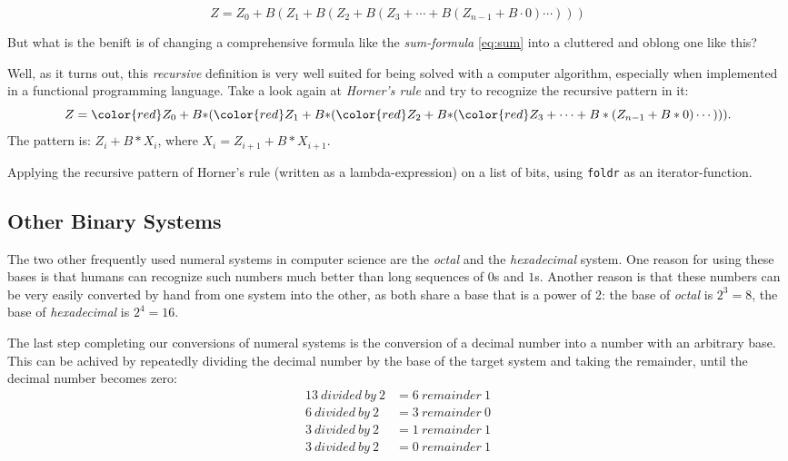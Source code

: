 \begin{equation} \label{eq:horner}
\boxed{Z=Z_0+B(Z_1+B(Z_2+B(Z_3+\cdots+B(Z_{n-1}+B\cdot0)\cdots)))}
\end{equation}

But what is the benift is of changing a comprehensive formula like the \emph{sum-formula} \eqref{eq:sum} into a cluttered and oblong one like this?

Well, as it turns out, this \emph{recursive} definition is very well suited for being solved with a computer algorithm, especially when implemented in a functional programming language.
Take a look again at \emph{Horner's rule} and try to recognize the recursive pattern in it:
\begin{equation*}
Z={\color{red}Z_0+B*}({\color{red}Z_1+B*}({\color{red}Z_2+B*}({\color{red}Z_3}+\cdots+B*(Z_{n-1}+B*0)\cdots))).
\end{equation*}
The pattern is: $Z_i + B * X_i$, where $X_i = Z_{i+1} + B * X_{i+1}$.

\begin{impl}
Applying the recursive pattern of Horner's rule (written as a lambda-expression) on a list of bits, using \texttt{foldr} as an iterator-function. 
\end{impl}


\subsection{Other Binary Systems}

The two other frequently used numeral systems in computer science are the \emph{octal} and the \emph{hexadecimal} system.
One reason for using these bases is that humans can recognize such numbers much better than long sequences of $0$s and $1$s.
Another reason is that these numbers can be very easily converted by hand from one system into the other, as both share a base that is a power of 2: the base of \emph{octal} is $2^3=8$, the base of \emph{hexadecimal} is $2^4=16$.

The last step completing our conversions of numeral systems is the conversion of a decimal number into a number with an arbitrary base.
This can be achived by repeatedly dividing the decimal number by the base of the target system and
taking the remainder, until the decimal number becomes zero:
\begin{align*}
    13 \ divided \ by \ 2 &= 6 \ remainder \ 1 \\
     6 \ divided \ by \ 2 &= 3 \ remainder \ 0 \\
     3 \ divided \ by \ 2 &= 1 \ remainder \ 1 \\
     3 \ divided \ by \ 2 &= 0 \ remainder \ 1
\end{align*}

